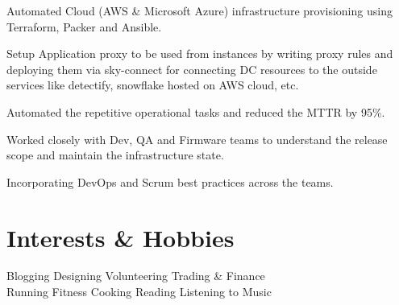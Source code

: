 \documentclass[a4paper]{deedy-resume-openfont}
\begin{document}
\begin{minipage}[t]{0.66\textwidth}
\begin{tightemize}
\item Automated Cloud (AWS \& Microsoft Azure) infrastructure provisioning using Terraform, Packer and Ansible.
\item Setup Application proxy to be used from instances by writing proxy rules and deploying them via sky-connect for connecting DC resources to the outside services like detectify, snowflake hosted on AWS cloud, etc.
\item Automated the repetitive operational tasks and reduced the MTTR by 95\%.
\item Worked closely with Dev, QA and Firmware teams to understand the release scope and maintain the infrastructure state.
\item Incorporating DevOps and Scrum best practices across the teams.
\end{tightemize}
\sectionsep


\section{Interests \& Hobbies}
Blogging \textbullet{} Designing \textbullet{} Volunteering \textbullet{} Trading \& Finance \\
Running \textbullet{} Fitness \textbullet{} Cooking \textbullet{} Reading  \textbullet{} Listening to Music


\end{minipage} 


\hfill

\vspace{\topsep}
\vspace{\topsep}
\vspace{\topsep}
\vspace{\topsep}
\end{document}
